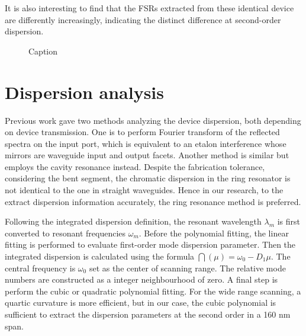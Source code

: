 It is also interesting to find that the FSRs extracted from these identical device are differently increasingly, indicating the distinct difference at second-order dispersion.

\begin{figure}
    \centering
    
    \caption{Caption}
    \label{fig:ntt_triplot}
\end{figure}


\section{Dispersion analysis}

Previous work \cite{Sunada2018} gave two methods analyzing the device dispersion, both depending on device transmission. One is to perform Fourier transform of the reflected spectra on the input port, which is equivalent to an etalon interference whose mirrors are waveguide input and output facets. Another method is similar but employs the cavity resonance instead. Despite the fabrication tolerance, considering the bent segment, the chromatic dispersion in the ring resonator is not identical to the one in straight waveguides. Hence in our research, to the extract dispersion information accurately, the ring resonance method is preferred. 

Following the integrated dispersion definition, the resonant wavelength $\lambda_m$ is first converted to resonant frequencies $\omega_m$. Before the polynomial fitting, the linear fitting is performed to evaluate first-order mode dispersion parameter. Then the integrated dispersion is calculated using the formula $ \dint(\mu) = \omega_0 - D_1 \mu$. The central frequency is $\omega_0$ set as the center of scanning range. The relative mode numbers are constructed as a integer neighbourhood of zero. A final step is perform the cubic or quadratic polynomial fitting. For the wide range scanning, a quartic curvature is more efficient, but in our case, the cubic polynomial is sufficient to extract the dispersion parameters at the second order in a 160 nm span.



